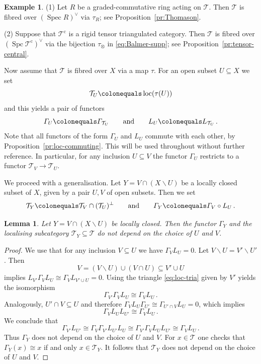 \documentclass{amsart}[a4]
\newtheorem{lemma}[theorem]{Lemma}
\theoremstyle{definition}
\newtheorem{example}[theorem]{Example}
\theoremstyle{remark}
\numberwithin{equation}{section}
\newcommand{\loc}{\operatorname{loc}}
\newcommand{\Spc}{\operatorname{Spc}}
\newcommand{\Spec}{\operatorname{Spec}}
\newcommand{\cat}{\mathcal}
\let\Gamma\varGamma
\begin{document}
\begin{example}
  (1) Let $R$ be a graded-commutative ring acting on $\cat T$. Then
  $\cat T$ is fibred over $(\Spec R)^\vee$ via $\tau_R$; see
  Proposition~\ref{pr:Thomason}.

  (2) Suppose that $\cat T^{\mathrm c}$ is a rigid tensor triangulated
  category. Then $\cat T$ is fibred over
  $(\Spc\cat T^{\mathrm c})^\vee$ via the bijection $\tau_\otimes$ in
  \eqref{eq:Balmer-supp}; see Proposition~\ref{pr:tensor-central}.
\end{example}

Now assume that $\cat T$ is fibred over $X$ via a map $\tau$.  For an
open subset $U\subseteq X$ we set
\[\cat T_U\colonequals\loc(\tau(U))\]
and this yields a pair of functors
\[\Gamma_U\colonequals\Gamma_{\cat T_U}\qquad\text{and}\qquad
  L_U\colonequals L_{\cat T_U}\,.\] Note that all functors of the form
$\Gamma_U$ and $L_U$ commute with each other, by
Proposition~\ref{pr:loc-commuting}. This will be used throughout
without further reference. In particular, for any inclusion
$U\subseteq V$ the functor $\Gamma_U$ restricts to a functor
$\cat T_V\to\cat T_U$.

We proceed with a generalisation. Let $Y=V\cap(X\smallsetminus U)$ be
a locally closed subset of $X$, given by a pair $U,V$ of open subsets. Then we
set
\[\cat T_Y\colonequals \cat T_V\cap (\cat
  T_U)^\perp\qquad\text{and}\qquad \Gamma_Y\colonequals \Gamma_V\circ
  L_U\,.\]

\begin{lemma}
  Let $Y=V\cap(X\smallsetminus U)$ be locally closed. Then the functor
  $\Gamma_Y$ and the localising subcategory $\cat T_Y\subseteq\cat T$ do
  not depend on the choice of $U$ and $V$.
\end{lemma}
\begin{proof}
  We use that for any inclusion $V\subseteq U$ we have
  $\Gamma_V L_U=0$.  Let $V\smallsetminus U=V'\smallsetminus U'$. Then
  \[V=(V\smallsetminus U)\cup(V\cap U)\subseteq V'\cup U\] implies
  $L_{V'}\Gamma_V L_U\cong\Gamma_V L_{V'\cup U}=0$. Using the triangle
  \eqref{eq:loc-tria} given by $V'$ yields the isomorphism
  \[\Gamma_{V'}\Gamma_V L_U\cong\Gamma_V L_U\,.\]
  Analogously, $U'\cap V\subseteq U$ and therefore
  $\Gamma_V L_U \Gamma_{U'}\cong\Gamma_{U'\cap V}L_U=0$, which implies
  \[\Gamma_V L_U L_{U'}\cong  \Gamma_V L_U\,.\]
  We conclude that
  \[\Gamma_{V'} L_{U'}\cong \Gamma_{V}\Gamma_{V'} L_{U'} L_{U}\cong
    \Gamma_{V'}\Gamma_{V} L_{U} L_{U'}\cong\Gamma_V L_U\,.\]
  Thus $\Gamma_Y$ does not depend on the choice of $U$ and $V$. For
  $x\in\cat T$ one checks that $\Gamma_Y(x)\cong x$ if and only $x\in\cat T_Y$.
It follows that $\cat T_Y$ does not depend on the choice of $U$ and $V$.
\end{proof}
\end{document}
